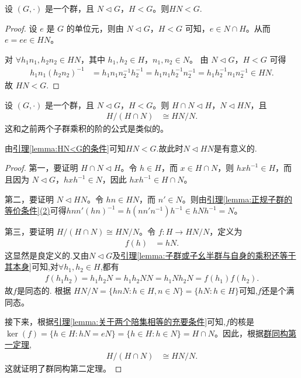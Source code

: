\documentclass[../../main.tex]{subfiles}
\begin{document}
\begin{lemma}\label{lemma:HN<G的条件}
设 \((G, \cdot)\) 是一个群，且 \(N \lhd G\)，\(H < G\)。则$HN<G$.
\end{lemma}
\begin{proof}
设 \(e\) 是 \(G\) 的单位元，则由 \(N \lhd G\)，\(H < G\) 可知，\(e \in N \cap H\)。从而 \(e = ee \in HN\)。

对 \(\forall h_1n_1, h_2n_2 \in HN\)，其中 \(h_1, h_2 \in H\)，\(n_1, n_2 \in N\)。
由 \(N \lhd G\)，\(H < G\) 可得
\begin{align*}
h_1n_1\left( h_2n_2 \right) ^{-1} &= h_1n_1n_{2}^{-1}h_{2}^{-1} = h_1n_1h_{2}^{-1}n_{2}^{-1} = h_1h_{2}^{-1}n_1n_{2}^{-1} \in HN.
\end{align*}
故 \(HN < G\).
\end{proof}

\begin{theorem}[群同构第二定理]\label{theorem:群同构第二定理}
设 \((G, \cdot)\) 是一个群，且 \(N \lhd G\)，\(H < G\)。则 \(H \cap N \lhd H\)，\(N \lhd HN\)，且
\begin{align*}
H/(H \cap N) &\cong HN/N .
\end{align*}
这和之前两个子群乘积的阶的公式是类似的。
\end{theorem}
\begin{remark}
由\hyperref[lemma:HN<G的条件]{引理\ref{lemma:HN<G的条件}}可知$HN<G$.故此时\(N \lhd HN\)是有意义的.
\end{remark}
\begin{proof}
第一，要证明 \(H \cap N \lhd H\)。令 \(h \in H\)，而 \(x \in H \cap N\)，则 \(hxh^{-1} \in H\)，而且因为 \(N \lhd G\)，\(hxh^{-1} \in N\)，因此 \(hxh^{-1} \in H \cap N\)。

第二，要证明 \(N \lhd HN\)。令 \(hn \in HN\)，而 \(n' \in N\)。则由\hyperref[lemma:正规子群的等价条件]{引理\ref{lemma:正规子群的等价条件}(2)}可得\(hnn'(hn)^{-1} = h(nn'n^{-1})h^{-1} \in hNh^{-1} = N\)。

第三，要证明 \(H/(H \cap N) \cong HN/N\)。令 \(f: H \to HN/N\)，定义为
\begin{align*}
f(h) &= hN .
\end{align*}
这显然是良定义的.又由\(N \lhd G\)及\hyperref[lemma:子群或子幺半群与自身的乘积还等于其本身]{引理\ref{lemma:子群或子幺半群与自身的乘积还等于其本身}}可知,对$\forall h_1,h_2\in H$,都有
\begin{align*}
f\left( h_1h_2 \right) =h_1h_2N=h_1h_2NN=h_1Nh_2N=f\left( h_1 \right) f\left( h_2 \right) .
\end{align*}
故$f$是同态的.
根据 \(HN/N = \{hnN : h \in H, n \in N\} = \{hN : h \in H\}\)可知,$f$还是个满同态。

接下来，根据\hyperref[lemma:关于两个陪集相等的充要条件]{引理\ref{lemma:关于两个陪集相等的充要条件}}可知,$f$的核是 \(\ker(f) = \{h \in H : hN = eN\} = \{h \in H : h \in N\} = H \cap N\)。因此，根据\hyperref[theorem:群同构第一定理]{群同构第一定理},
\begin{align*}
H/(H \cap N) &\cong HN/N .
\end{align*}
这就证明了群同构第二定理。
\end{proof}
\end{document}
